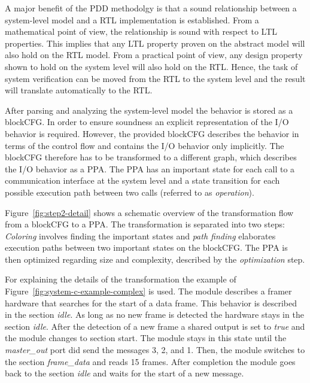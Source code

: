 A major benefit of the PDD methodolgy is that a sound relationship between a system-level model and a RTL implementation is established. 
From a mathematical point of view, the relationship is sound with respect to LTL properties. This implies that any LTL property proven on the abstract model will also hold on the RTL model. 
From a practical point of view, any design property shown to hold on the system level will also hold on the RTL. 
Hence, the task of system verification can be moved from the RTL to the system level and the result will translate automatically to the RTL. 

After parsing and analyzing the system-level model the behavior is stored as a blockCFG.
In order to ensure soundness an explicit representation of the I/O behavior is required. However, the provided blockCFG describes the behavior in terms of the control flow and contains the I/O behavior only implicitly.
The blockCFG therefore has to be transformed to a different graph, which describes the I/O behavior as a PPA.
The PPA has an important state for each call to a communication interface at the system level and a state transition for each possible execution path between two calls (referred to as \textit{operation}).  

Figure~\ref{fig:step2-detail} shows a schematic overview of the transformation flow from a blockCFG to a PPA.
The transformation is separated into two steps: \textit{Coloring} involves finding the important states and \textit{path finding} elaborates execution paths between two important states on the blockCFG.
The PPA is then optimized regarding size and complexity, described by the \textit{optimization} step. 


For explaining the details of the transformation the example of Figure~\ref{fig:system-c-example-complex} is used. 
The module describes a framer hardware that searches for the start of a data frame. 
This behavior is described in the section \textit{idle}.
As long as no new frame is detected the hardware stays in the section \textit{idle}. 
After the detection of a new frame a shared output is set to \textit{true} and the module changes to section start. 
The module stays in this state until the \textit{master\_out} port did send the messages 3, 2, and 1. 
Then, the module switches to the section \textit{frame\_data} and reads 15 frames. 
After completion the module goes back to the section \textit{idle} and waits for the start of a new message. 


